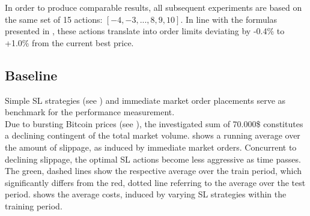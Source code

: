 In order to produce comparable results, all subsequent experiments are based on the same set of 15 actions: $[-4, -3, ..., 8, 9, 10]$. In line with the formulas presented in , these actions translate into order limits deviating by -0.4\% to +1.0\% from the current best price.



\subsection{Baseline}
\label{chap:experiments:baseline}
Simple \ac{SL} strategies (see ) and immediate market order placements serve as benchmark for the performance measurement.\\

Due to bursting Bitcoin prices (see ), the investigated sum of 70.000\$ constitutes a declining contingent of the total market volume.  shows a running average over the amount of slippage, as induced by immediate market orders. Concurrent to declining slippage, the optimal \ac{SL} actions become less aggressive as time passes. The green, dashed lines show the respective average over the train period, which significantly differs from the red, dotted line referring to the average over the test period.  shows the average costs, induced by varying \ac{SL} strategies within the training period.

